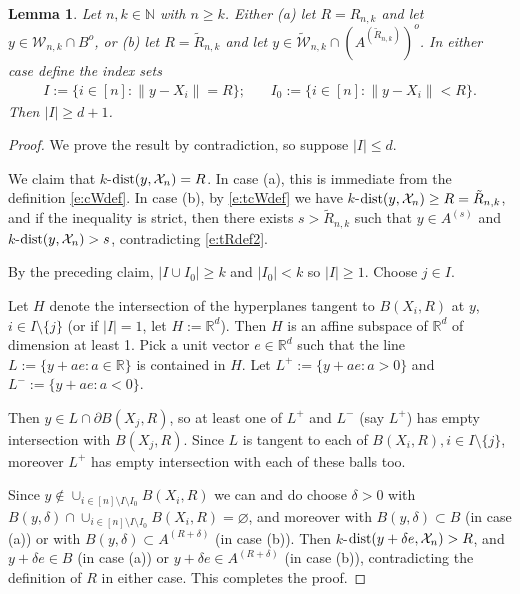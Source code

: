 \documentclass[12pt]{article}
\newcommand{\N}{\mathbb{N}}
\newcommand{\cX}{\mathcal{X}}
\newcommand{\cW}{\mathcal{W}}
\newcommand{\tcW}{\widetilde{\mathcal{W}}}
\newcommand{\X}{\mathcal{X}}
\renewcommand{\emptyset}{\varnothing}
\newcommand{\tR}{{\tilde{R}}}
\newcommand{\R}{\mathbb{R}}
\newcommand{\dist}{{\rm dist}}
\newtheorem{lemm}{Lemma}
\begin{document}
\begin{lemm}
	\label{l:I>d}
	Let $n,k \in \N$ with $n \geq k$. 
	Either (a) let $R= R_{n,k}$
	and let $y \in \cW_{n,k} \cap B^o$, 
	or (b) let $R= \tR_{n,k}$ and let 
	$y \in \tcW_{n,k} \cap (A^{(\tR_{n,k})})^o$.
	In either case
	define the index sets  
	\begin{align}
		I %
		:= \{i \in [n] : \|y -X_i\| = R\}; 
	~~~~~~~~
		I_0 %
		:= \{i \in [n]: \|y -X_i\| < R\}.
		\label{e:defII0}
		\end{align}
		Then $|I| \geq d+1$.
%
\end{lemm}
\begin{proof}
	We prove the result by contradiction, so
	suppose $|I| \leq d$.

	We claim that $k$-$\dist(y,\X_n) =R$. In case (a), this
	is immediate from the definition \eqref{e:cWdef}. In case (b),
	by \eqref{e:tcWdef} we have
	$k$-$\dist(y,\X_n) \geq R = \tR_{n,k}$, and if the inequality is
	strict, then 
	 there exists $s > \tR_{n,k}$ such that
	$y \in A^{(s)}$ and
	$k$-$\dist(y,\X_n) > s$, contradicting \eqref{e:tRdef2}.




	By the preceding claim,
	$|I \cup I_0| \geq k$ and $|I_0| < k$ so $|I| \geq 1$.
	Choose $j \in I$.

	Let $H$ denote the intersection of the hyperplanes tangent to
	$B(X_i,R)$  at $y$, $ i \in I \setminus \{j\}$ (or if $|I|=1$,
	let $H := \mathbb R^d$). Then
	$H$ is an affine subspace of $\mathbb R^d$ of dimension at least 1.
	Pick a unit vector $e \in \mathbb R^d$ such that
	the line  $L:= \{y + ae: a \in \R\}$  is contained in $H$.
	Let $L^+:= \{y+ae: a > 0\}$ and $L^-:= \{y+a e: a < 0\}$.

	Then $y \in L \cap \partial B(X_j,R)$, so 
	at least one of $L^+$ and $L^-$ (say $L^+$) 
	has empty intersection with $B(X_j,R)$. Since
	$L$ is tangent to each of $B(X_i,R), i \in I \setminus \{j\}$,
	moreover $L^+$ has empty intersection with each of these balls too.

	Since $y \notin \cup_{i\in [n] \setminus I \setminus I_0}
	B(X_i,R)$ we can and do choose $\delta >0$ with 
	$B(y, \delta) \cap \cup_{i \in [n] \setminus I \setminus I_0} B(X_i,R) = \emptyset$, 
	and moreover  with
	$B(y, \delta ) \subset B$ (in  case (a)) 
	or with $B(y, \delta) \subset A^{(R + \delta)}$
	(in case (b)).
	Then
	 $k$-$\dist(y + \delta e, \X_n) > R$,
	and $y + \delta e \in B$ (in case (a)) or $y + \delta e
	\in A^{(R + \delta)}$ (in case (b)),
	contradicting the definition of $R$ in either case.
	This completes the proof.
\end{proof}
\end{document}
